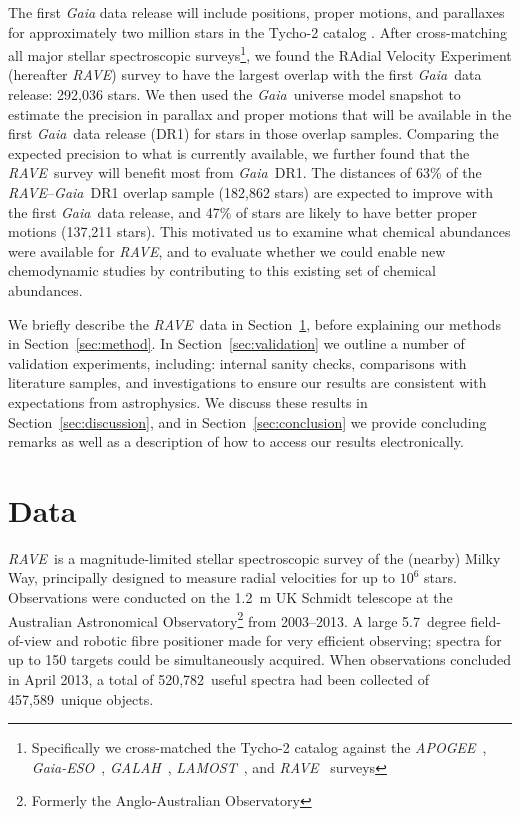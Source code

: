 \documentclass[preprint,trackchanges]{aastex}
\newcommand{\acronym}[1]{{\small{#1}}}
\newcommand{\project}[1]{\textsl{#1}}
\newcommand{\gaia}{\project{Gaia}}
\newcommand{\rave}{\project{\acronym{RAVE}}}
\newcommand{\galah}{\project{\acronym{GALAH}}}
\newcommand{\ges}{\project{Gaia-ESO}}
\newcommand{\apogee}{\project{\acronym{APOGEE}}}
\newcommand{\lamost}{\project{\acronym{LAMOST}}}
\newcommand{\Nspectra}{520,782}
\newcommand{\Nstars}{457,589}
\begin{document}
The first \project{Gaia} data release will include positions, proper motions, and 
parallaxes for approximately two million stars in the Tycho-2 \citep{Hog_2000} 
catalog \citep{Michalik_2015a,Michalik_2015b}.  After cross-matching all major 
stellar spectroscopic surveys\footnote{Specifically we cross-matched the Tycho-2
catalog against the \apogee\ \citep{Zasowski_2013}, \ges\
\citep{Gilmore_2012,Randich_2013}, \galah\ \citep{DeSilva_2015},
\lamost\ \citep{Cui_2012}, and \rave\ \citep{Steinmetz_2006} 
surveys}, we found the RAdial Velocity Experiment (hereafter \rave) survey to 
have the largest overlap with the first \gaia\ data release: 292,036 
stars.  We then used the \gaia\ universe model snapshot \citep{Robin_2012} to 
estimate the precision in parallax and proper motions that will be available in 
the first \gaia\ data release (DR1) for stars in those overlap samples. Comparing
the expected precision to what is currently available, we further found that the
\rave\ survey will benefit most from \gaia\ DR1.  The distances of 63\% of the 
\rave--\gaia\ DR1 overlap sample (182,862 stars) are expected to improve with 
the first \gaia\ data release, and 47\% of stars are likely to have better 
proper motions (137,211 stars).  This motivated us to examine what chemical 
abundances were available for \rave, and to evaluate whether we could enable new 
chemodynamic studies by contributing to this existing set of chemical abundances.


We briefly describe the \rave\ data in Section~\ref{sec:data}, before explaining
our methods in Section~\ref{sec:method}.  In Section~\ref{sec:validation}
we outline a number of validation experiments, including: internal sanity checks,
comparisons with literature samples, and investigations to ensure our results
are consistent with expectations from astrophysics.  We discuss these results in
Section~\ref{sec:discussion}, and in Section~\ref{sec:conclusion} we provide 
concluding remarks as well as a description of how to access our results electronically.


\section{Data}
\label{sec:data}


\rave\ is a magnitude-limited stellar spectroscopic survey of the (nearby) Milky Way,
principally designed to measure radial velocities for up to $10^6$ stars.
Observations were conducted on the 1.2~m UK Schmidt telescope at the Australian 
Astronomical Observatory\footnote{Formerly the Anglo-Australian Observatory} from 
2003--2013.  A large 5.7~degree field-of-view and robotic fibre positioner 
made for very efficient observing;  spectra for up to 150 targets could be simultaneously
acquired.  When observations concluded in April 2013, a total of \Nspectra\ useful spectra
had been collected of \Nstars\ unique objects. 
\end{document}
